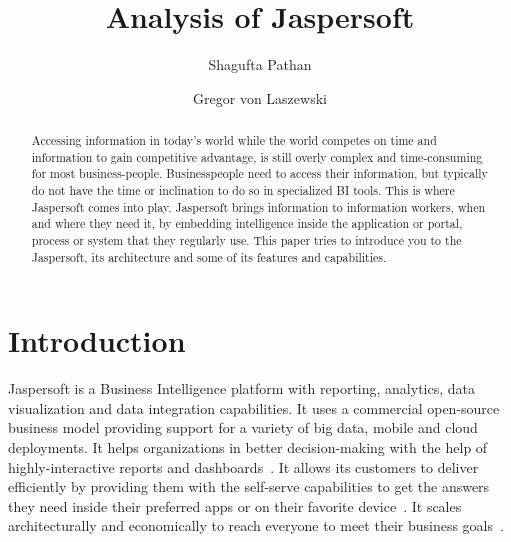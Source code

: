 
\title{Analysis of Jaspersoft}


\author{Shagufta Pathan}

\author{Gregor von Laszewski}


\renewcommand{\shortauthors}{G. v. Laszewski}


\begin{abstract}
Accessing information in today's world while the world competes on time and
information to gain competitive advantage, is still overly complex and
time-consuming for most business-people. Businesspeople need to access their
information, but typically do not have the time or inclination to do so in
specialized BI tools. This is where Jaspersoft comes into play. Jaspersoft
brings information to information workers, when and where they need it, by
embedding intelligence inside the application or portal, process or system that
they regularly use. This paper tries to introduce you to the Jaspersoft, its
architecture and some of its features and capabilities. 
\end{abstract}


\maketitle

\section{Introduction}
Jaspersoft is a Business Intelligence platform with reporting, analytics, data
visualization and data integration capabilities. It uses a commercial
open-source business model providing support for a variety of big data, mobile
and cloud deployments. It helps organizations in better decision-making with the
help of highly-interactive reports and
dashboards~\cite{hid-sp18-516-www-finances-online}. It allows its customers to
deliver efficiently by providing them with the self-serve capabilities to get
the answers they need inside their preferred apps or on their favorite
device~\cite{hid-sp18-516-www-jaspersoft-overview}. It scales architecturally
and economically to reach everyone to meet their business
goals~\cite{hid-sp18-516-www-finances-online}. 

